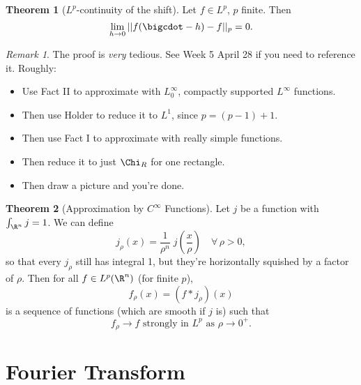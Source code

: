 \documentclass[a5paper]{article}
\theoremstyle{definition}%
\newtheorem{theorem}{Theorem}
\numberwithin{exercise}{section}
\theoremstyle{remark}%
\newtheorem*{remark*}{Remark}
\renewcommand{\L}{L}
\begin{document}
\setcounter{footnote}{0}

\begin{highlight}
\begin{theorem}[$L^p$-continuity of the shift]
Let $f\in L^p$, $p$ finite. Then 
$$\lim_{h\to0} \norm{f(\dot-h)-f}_p=0.$$
\end{theorem}
\end{highlight}
\begin{remark*}
The proof is \textit{very} tedious. See Week 5 April 28 if you need to reference it. Roughly:
\begin{itemize}
	\item Use Fact II to approximate with $L^\infty_0$, compactly supported $L^\infty$ functions. 
	\item Then use Holder to reduce it to $L^1$, since $p=(p-1)+1$.
	\item Then use Fact I to approximate with really simple functions. 
	\item Then reduce it to just $\Chi_R$ for one rectangle.	
	\item Then draw a picture and you're done. 
\end{itemize}
\end{remark*}

\begin{highlight}
\begin{theorem}[Approximation by $C^\infty$ Functions]\footnotemark
Let $j$ be a function with $\int_{\Rn} j = 1$.\footnotemark{} We can define 
$$j_\rho(x)=\frac{1}{\rho^n}\;j\left(\frac{x}{\rho}\right)\quad \forall\, \rho>0,$$
so that every $j_\rho$ still has integral 1, but they're horizontally squished by a factor of $\rho$. Then for all $f\in\L^p(\Rn)$ (for finite $p$), 
$$f_\rho(x) = (f*j_\rho)(x)$$
is a sequence of functions (which are smooth if $j$ is) such that 
$$f_\rho\to f\text{ strongly in }L^p\text{ as }\rho\to0^+.$$
\end{theorem}
\end{highlight}



\section{Fourier Transform}

\let\oldhat\hat
\renewcommand{\hat}{\widehat}
\end{document}
